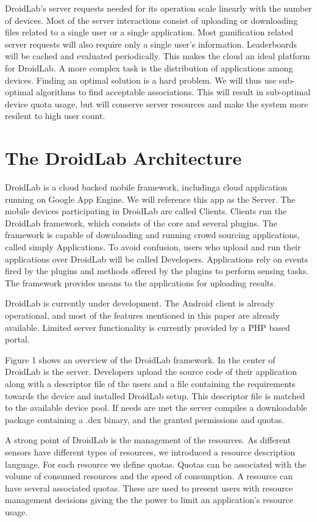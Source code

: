 \documentclass[conference,letterpaper]{IEEEtran}
\begin{document}
DroidLab's server requests needed for its operation scale linearly with the number of devices. Most of the server interactions consist of uploading or downloading files related to a single user or a single application. Most gamification related server requests will also require only a single user's information. Leaderboards will be cached and evaluated periodically. This makes the cloud an ideal platform for DroidLab. A more complex task is the distribution of applications among devices. Finding an optimal solution is a hard problem. We will thus use sub-optimal algorithms to find acceptable associations. This will result in sub-optimal device quota usage, but will conserve server resources and make the system more resilent to high user count.

\section{The DroidLab Architecture}

DroidLab is a cloud backed mobile framework, includinga cloud application running on Google App Engine. We will reference this app as the Server. The mobile devices participating in DroidLab are called Clients. Clients run the DroidLab framework, which consists of the core and several plugins. The framework is capable of downloading and running crowd sourcing applications, called simply Applications. To avoid confusion, users who upload and run their applications over DroidLab will be called Developers. Applications rely on events fired by the plugins and methods offered by the plugins to perform sensing tasks. The framework provides means to the applications for uploading results.

DroidLab is currently under development. The Android client is already operational, and most of the features mentioned in this paper are already available. Limited server functionality is currently provided by a PHP based portal.

Figure 1 shows an overview of the DroidLab framework. In the center of DroidLab is the server. Developers upload the source code of their application along with a descriptor file of the users and a file containing the requirements towards the device and installed DroidLab setup. This descriptor file is matched to the available device pool. If needs are met the server compiles a downloadable package containing a .dex binary, and the granted permissions and quotas.

A strong point of DroidLab is the management of the resources. As different sensors have different types of resources, we introduced a resource description language. For each resource we define quotas. Quotas can be associated with the volume of consumed resources and the speed of consumption. A resource can have several associated quotas. These are used to present users with resource management decisions giving the the power to limit an application's resource usage.
\end{document}
